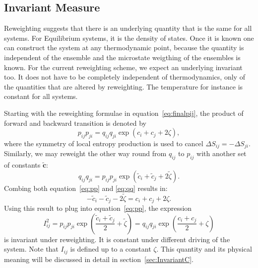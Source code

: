 \subsection{Invariant Measure}
\label{sec:Invariant}
Reweighting suggests that there is an underlying quantity that is the same for all systems. For Equilibrium systems, it is the density of states. Once it is known one can construct the system at any thermodynamic point, because the quantity is independent of the ensemble and the microstate weigthing of the ensembles is known. For the current reweighting scheme, we expect an underlying invariant too. It does not have to be completely independent of thermodynamics, only of the quantities that are altered by reweighting. The temperature for instance is constant for all systems.

Starting with the reweighting formulae in equation~\ref{eq:finalpij}, the product of forward and backward transition is denoted by
  \begin{equation}
    p_{ij} p_{ji} = q_{ij} q_{ji} \exp ( c_i + c_j + 2 \zeta ),
    \label{eq:pp}
  \end{equation}
where the symmetry of local entropy production is used to cancel $\Delta S_{ij} =- \Delta S_{ji}$. Similarly, we may reweight the other way round from $q_{ij}$ to $p_{ij}$ with another set of constants $\mathbf{\tilde c}$:
  \begin{equation}
    q_{ij} q_{ji} = p_{ij} p_{ji} \exp ( \tilde c_i + \tilde c_j + 2 \tilde 
\zeta  ) .
    \label{eq:qq}
  \end{equation}
  Combing both equation~\ref{eq:pp} and \ref{eq:qq} results in:
  \begin{equation}
    - \tilde c_i - \tilde c_j - 2 \tilde \zeta = c_i + c_j + 2 \zeta.
  \end{equation}
Using this result to plug into equation~\ref{eq:pp}, the expression 
  \begin{equation}
    I_{ij}^2 = p_{ij} p_{ji} \exp \left ( \frac{\tilde c_i + \tilde c_j}{2} +\tilde 
\zeta \right ) 
= q_{ij} q_{ji} \exp\left ( \frac{ c_i + c_j}{2}+ \zeta \right )
  \end{equation}
is invariant under reweighting. It is constant under different driving of the  system. Note that $I_{ij}$ is defined up to a constant $\zeta$. This quantity and its physical meaning will be discussed in detail in section~\ref{sec:InvariantC}. 
 
